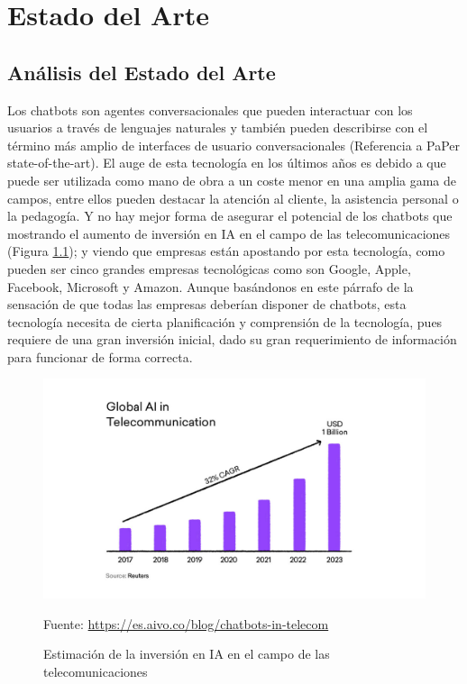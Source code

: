 \chapter{Estado del Arte}

\section{Análisis del Estado del Arte}

Los chatbots son agentes conversacionales que pueden interactuar con los usuarios a través de lenguajes naturales y también pueden describirse con el término más amplio de interfaces de usuario conversacionales (Referencia a PaPer state-of-the-art). El auge de esta tecnología en los últimos años es debido a que puede ser utilizada como mano de obra a un coste menor en una amplia gama de campos, entre ellos pueden destacar la atención al cliente, la asistencia personal o la pedagogía. Y no hay mejor forma de asegurar el potencial de los chatbots que mostrando el aumento de inversión en IA en el campo de las telecomunicaciones (Figura \ref{fig:inversion_chatbot}); y viendo que empresas están apostando por esta tecnología, como pueden ser cinco grandes empresas tecnológicas como son Google, Apple, Facebook, Microsoft y Amazon. Aunque basándonos en este párrafo de la sensación de que todas las empresas deberían disponer de chatbots, esta tecnología necesita de cierta planificación y comprensión de la tecnología, pues requiere de una gran inversión inicial, dado su gran requerimiento de información para funcionar de forma correcta.

\begin{figure}[h]
\centering
\includegraphics[width=1.0\textwidth]{imagenes/02_EstadoDelArte/inversion_chatbots.jpg}
\begin{center}
Fuente: \url{https://es.aivo.co/blog/chatbots-in-telecom}
\end{center}
\caption{Estimación de la inversión en IA en el campo de las telecomunicaciones}
\label{fig:inversion_chatbot}
\end{figure}

